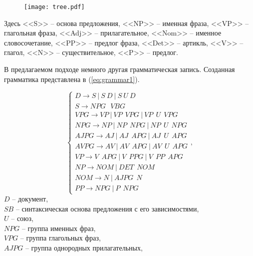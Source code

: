 \documentclass[../main]{subfiles}
\begin{document}
\begin{figure}[H]
    \centering
    {\texttt{[image: tree.pdf]}}
    \vspace{-\baselineskip}
\end{figure}

Здесь <<S>> -- основа предложения, <<NP>> -- именная фраза, <<VP>> -- глагольная фраза, <<Adj>> -- прилагательное, <<Nom>> -- именное словосочетание, <<PP>> -- предлог фраза, <<Det>> -- артикль, <<V>> -- глагол, <<N>> -- существительное, <<P>> -- предлог.

В предлагаемом подходе немного другая грамматическая запись. Созданная грамматика представлена в (\ref{eq:grammar1}). 

\begin{equation}
    \label{eq:grammar1}
    \left\{ 
        \begin{array}{l}
            D \rightarrow S\ |\ S\ D\ |\ S\ U\ D\ \\
            S \rightarrow NPG\ \ \ VBG \\
            VPG \rightarrow VP\ |\ VP\ \ VPG\ |\ VP\ \ U\ \ VPG \\
            NPG \rightarrow NP\ |\ NP\ \ NPG\ |\ NP\ \ U\ \ NPG \\
            AJPG \rightarrow AJ\ |\ AJ\ \ APG\ |\ AJ\ \ U\ \ APG \\
            AVPG \rightarrow AV\ |\ AV\ \ APG\ |\ AV\ \ U\ \ APG \\
            VP \rightarrow V \ \ APG\ |\ V\ \ PPG\ |\ V\ \ PP\ \ APG \\
            NP \rightarrow NOM\ |\ DET\ \ NOM \\
            NOM \rightarrow N\ |\ AJPG\ \ N \\
            PP \rightarrow NPG\ |\ P\ \ NPG
        \end{array}
    \right.,
\end{equation}
$D$ -- документ,\\
\makebox[1.25cm]{}$SB$ -- синтаксическая основа предложения с его зависимостями,\\
\makebox[1.25cm]{}$U$ -- союз,\\
\makebox[1.25cm]{}$NPG$ -- группа именных фраз,\\
\makebox[1.25cm]{}$VPG$ -- группа глагольных фраз,\\
\makebox[1.25cm]{}$AJPG$ -- группа однородных прилагательных,\\
\end{document}

